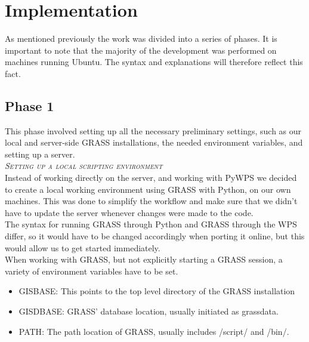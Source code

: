 
\chapter{Implementation} %

\label{ch:theory} %


As mentioned previously the work was divided into a series of phases. It is important to note that the majority of the development was performed on machines running Ubuntu. The syntax and explanations will therefore reflect this fact.

\section{Phase 1}
This phase involved setting up all the necessary preliminary settings, such as our local and server-side GRASS installations, the needed environment variables, and setting up a server. \\

\textsc{\textit{Setting up a local scripting environment}} \\

Instead of working directly on the server, and working with PyWPS we decided to create a local working environment using GRASS with Python, on our own machines. This was done to simplify the workflow and make sure that  we didn't have to update the server whenever changes were made to the code. \\
The syntax for running GRASS through Python and GRASS through the WPS differ, so it would have to be changed accordingly when porting it online, but this would allow us to get started immediately. \\
When working with GRASS, but not explicitly starting a GRASS session, a variety of environment variables have to be set. 

\begin{itemize}
\item \textsc{GISBASE}: This points to the top level directory of the GRASS installation
\item \textsc{GISDBASE}: GRASS' database location, usually initiated as grassdata.
\item \textsc{PATH}: The path location of GRASS, usually includes /script/ and /bin/.
\end{itemize} \\


